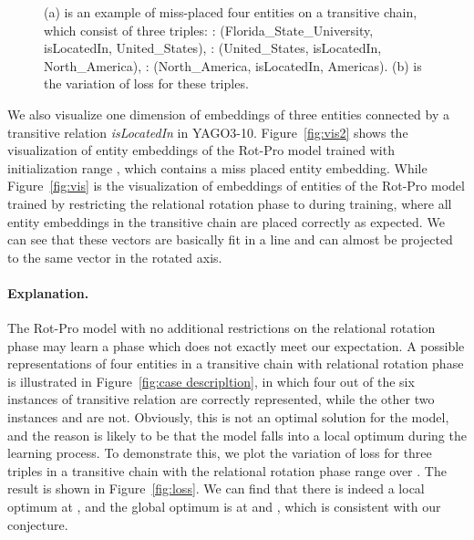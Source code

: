 \documentclass{article}
\begin{document}
\begin{figure}
  \centering
{}
\caption{(a) is an example of miss-placed four entities on a transitive chain, which consist of three triples: : (Florida\_State\_University, isLocatedIn, United\_States), : (United\_States, isLocatedIn, North\_America), : (North\_America, isLocatedIn, Americas). (b) is the variation of loss for these triples.}
\label{fig:illustration and loss}
\end{figure}

We also visualize one dimension of embeddings of three entities connected by a transitive relation \emph{isLocatedIn} in YAGO3-10. Figure~\ref{fig:vis2} shows the visualization of entity embeddings of the Rot-Pro model trained with initialization range , which contains a miss placed entity embedding. While Figure~\ref{fig:vis} is the visualization of embeddings of entities of the Rot-Pro model trained by restricting the relational rotation phase to  during training, where all entity embeddings in the transitive chain are placed correctly as expected. We can see that these vectors are basically fit in a line and can almost be projected to the same vector in the rotated axis.

\paragraph{Explanation.} The Rot-Pro model with no additional restrictions on the relational rotation phase may learn a phase  which does not exactly meet our expectation. A possible representations of four entities in a transitive chain with relational rotation phase  is illustrated in Figure~\ref{fig:case descripltion}, in which four out of the six instances of transitive relation are correctly represented, while the other two instances  and  are not. Obviously, this is not an optimal solution for the model, and the reason is likely to be that the model falls into a local optimum during the learning process.
To demonstrate this, we plot the variation of loss for three triples in a transitive chain with the relational rotation phase range over . The result is shown in Figure~\ref{fig:loss}. We can find that there is indeed a local optimum at , and the global optimum is at  and , which is consistent with our conjecture.
\end{document}
